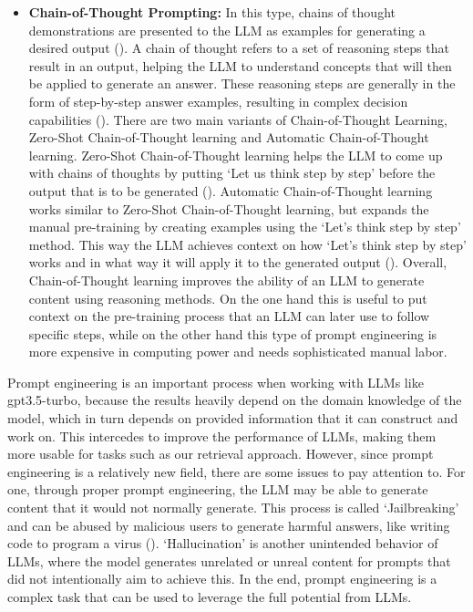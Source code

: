 \documentclass[english,bachelor]{swsLeipzig}
\begin{document}
\begin{itemize}
  \item \textbf{Chain-of-Thought Prompting:} In this type, chains of thought demonstrations are presented to the LLM as 
  examples for generating a desired output (\citet{wei:2022}). A chain of thought refers to a set of reasoning steps that result in an output, helping the LLM to understand concepts that will then be applied to generate an answer. These reasoning steps are generally in the form of step-by-step answer examples, resulting in complex decision capabilities (\citet{kojima:2022}). There are two main variants of Chain-of-Thought Learning, Zero-Shot Chain-of-Thought learning and Automatic Chain-of-Thought learning. Zero-Shot Chain-of-Thought learning helps the LLM to come up with chains of thoughts by putting `Let us think step by step' before the output that is to be generated (\citet{kojima:2022}). Automatic Chain-of-Thought learning works similar to Zero-Shot Chain-of-Thought learning, but expands the manual pre-training by creating examples using the `Let's think step by step' method. This way the LLM achieves context on how `Let's think step by step' works and in what way it will apply it to the generated output (\citet{zhang:2022}). Overall, Chain-of-Thought learning improves the ability of an LLM to generate content using reasoning methods. On the one hand this is useful to put context on the pre-training process that an LLM can later use to follow specific steps, while on the other hand this type of prompt engineering is more expensive in computing power and needs sophisticated manual labor.
\end{itemize}

Prompt engineering is an important process when working with LLMs like gpt3.5-turbo, because the results heavily depend 
on the domain knowledge of the model, which in turn depends on provided information that it can construct and work on. This intercedes to improve the performance of LLMs, making them more usable for tasks such as our retrieval approach. However, since prompt engineering is a relatively new field, there are some issues to pay attention to. For one, through proper prompt engineering, the LLM may be able to generate content that it would not normally generate. This process is called `Jailbreaking' and can be abused by malicious users to generate harmful answers, like writing code to program a virus (\citet{liujailbreaking:2023}). `Hallucination' is another unintended behavior of LLMs, where the model generates unrelated or unreal content for prompts that did not intentionally aim to achieve this. In the end, prompt engineering is a complex task that can be used to leverage the full potential from LLMs.
\end{document}
